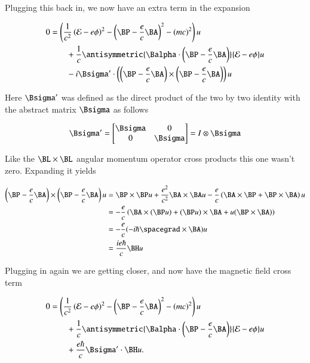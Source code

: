 Plugging this back in, we now have an extra term in the expansion

\begin{align*}
0
&=
\left(
\inv{c^2} \left( \mathcal{E} - e \phi \right)^2
- \left( \BP - \frac{e}{c} \BA \right)^2
- (mc)^2
\right) u
\\
&\qquad + \inv{c} \antisymmetric{
\Balpha \cdot \left(\BP - \frac{e}{c} \BA \right)
}
{
\mathcal{E} - e \phi
} u
\\
&\qquad
- i \Bsigma' \cdot
\left(
\left( \BP - \frac{e}{c} \BA \right) \cross \left( \BP - \frac{e}{c} \BA \right)
\right)
 u
\end{align*}

Here $\Bsigma'$ was defined as the direct product of the two by two identity with the abstract matrix $\Bsigma$ as follows

\begin{equation}\label{eqn:diracGauge:380}
\Bsigma' =
\begin{bmatrix}
\Bsigma & 0 \\
0 & \Bsigma
\end{bmatrix}
= I \otimes \Bsigma
\end{equation}

Like the $\BL \cross \BL$ angular momentum operator cross products this one wasn't zero.  Expanding it yields

\begin{align*}
\left( \BP - \frac{e}{c} \BA \right) \cross \left( \BP - \frac{e}{c} \BA \right)
 u
&=
\BP \cross \BP u
+ \frac{e^2}{c^2} \BA \cross \BA u
- \frac{e}{c} \left( \BA \cross \BP + \BP \cross \BA \right) u \\
&=
- \frac{e}{c} \left( \BA \cross (\BP u) + (\BP u) \cross \BA + u (\BP \cross \BA) \right) \\
&=
- \frac{e}{c} (-i \hbar \spacegrad \cross \BA) u \\
&=
\frac{i e \hbar}{c} \BH u
\end{align*}

Plugging in again we are getting closer, and now have the magnetic field cross term

\begin{align*}
0
&=
\left(
\inv{c^2} \left( \mathcal{E} - e \phi \right)^2
- \left(\BP - \frac{e}{c} \BA \right)^2
- (mc)^2
\right) u
\\
&\qquad + \inv{c}
\antisymmetric{
\Balpha \cdot \left(\BP - \frac{e}{c} \BA \right)
}
{
\mathcal{E} - e \phi
} u
\\
&\qquad
+ \frac{e \hbar}{c} \Bsigma' \cdot \BH u.
\end{align*}

